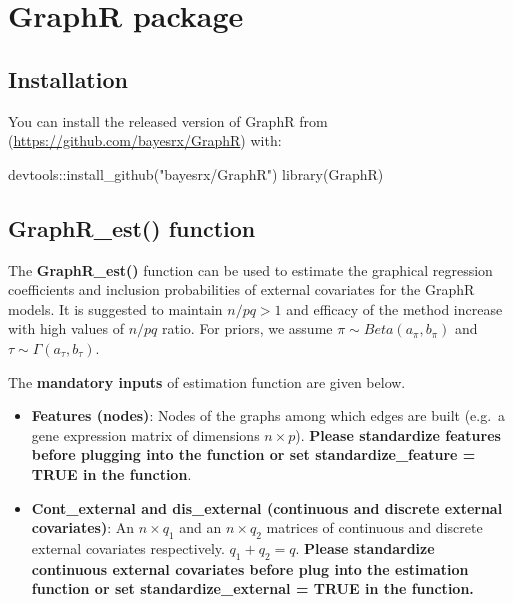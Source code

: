 \documentclass[
]{book}
\newenvironment{Shaded}{\begin{snugshade}}{\end{snugshade}}
\newcommand{\FunctionTok}[1]{\textcolor[rgb]{0.00,0.00,0.00}{#1}}
\newcommand{\NormalTok}[1]{#1}
\newcommand{\SpecialCharTok}[1]{\textcolor[rgb]{0.00,0.00,0.00}{#1}}
\newcommand{\StringTok}[1]{\textcolor[rgb]{0.31,0.60,0.02}{#1}}
\begin{document}
\hypertarget{GraphRpackage}{%
\section{GraphR package}\label{GraphRpackage}}

\hypertarget{installation}{%
\subsection{Installation}\label{installation}}

You can install the released version of GraphR from (\url{https://github.com/bayesrx/GraphR}) with:

\begin{Shaded}
\begin{Highlighting}[]
\NormalTok{devtools}\SpecialCharTok{::}\FunctionTok{install\_github}\NormalTok{(}\StringTok{"bayesrx/GraphR"}\NormalTok{)}
\FunctionTok{library}\NormalTok{(GraphR)}
\end{Highlighting}
\end{Shaded}

\hypertarget{graphr_est-function}{%
\subsection{GraphR\_est() function}\label{graphr_est-function}}

The \textbf{GraphR\_est()} function can be used to estimate the graphical regression coefficients and inclusion probabilities of external covariates for the GraphR models. It is suggested to maintain \(n/pq >1\) and efficacy of the method increase with high values of \(n/pq\) ratio. For priors, we assume \(\pi \sim Beta(a_\pi, b_\pi)\) and \(\tau \sim \Gamma(a_\tau, b_\tau)\).

The \textbf{mandatory inputs} of estimation function are given below.

\begin{itemize}
\item
  \textbf{Features (nodes)}: Nodes of the graphs among which edges are built (e.g.~a gene expression matrix of dimensions \(n \times p\)). \textbf{Please standardize features before plugging into the function or set standardize\_feature = TRUE in the function}.
\item
  \textbf{Cont\_external and dis\_external (continuous and discrete external covariates)}: An \(n \times q_1\) and an \(n \times q_2\) matrices of continuous and discrete external covariates respectively. \(q_1 + q_2 =q\). \textbf{Please standardize continuous external covariates before plug into the estimation function or set standardize\_external = TRUE in the function.}
\end{itemize}
\end{document}
